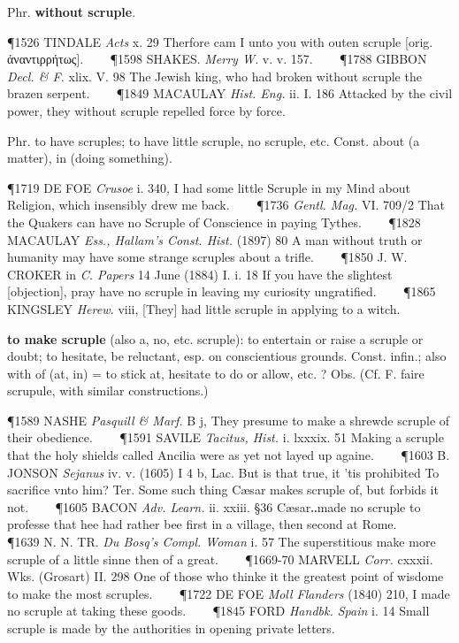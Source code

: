 \begin{description}[wide, labelwidth=!, labelindent=0pt]
\begin{myenumerate}
 Phr. \textbf{without scruple}.

\P 1526 TINDALE  \textit{Acts} x. 29 Therfore cam I unto you with outen scruple [orig. ἀναντιρρήτως].    
\P 1598 SHAKES.  \textit{Merry W.} v. v. 157.    
\P 1788 GIBBON  \textit{Decl. \& F.} xlix. V. 98 The Jewish king, who had broken without scruple the brazen serpent.    
\P 1849 MACAULAY  \textit{Hist. Eng.} ii. I. 186 Attacked by the civil power, they without scruple repelled force by force.

 Phr. to have scruples; to have little scruple, no scruple, etc. Const. about (a matter), in (doing something).

\P 1719 DE FOE  \textit{Crusoe} i. 340, I had some little Scruple in my Mind about Religion, which insensibly drew me back.    
\P 1736  \textit{Gentl. Mag.} VI. 709/2 That the Quakers can have no Scruple of Conscience in paying Tythes.    
\P 1828 MACAULAY  \textit{Ess., Hallam's Const. Hist.} (1897) 80 A man without truth or humanity may have some strange scruples about a trifle.    
\P 1850 J. W. CROKER in \textit{C. Papers} 14 June (1884) I. i. 18 If you have the slightest [objection], pray have no scruple in leaving my curiosity ungratified.    
\P 1865 KINGSLEY  \textit{Herew.} viii, [They] had little scruple in applying to a witch.

 \textbf{to make scruple} (also a, no, etc. scruple): to entertain or raise a scruple or doubt; to hesitate, be reluctant, esp. on conscientious grounds. Const. infin.; also with of (at, in) = to stick at, hesitate to do or allow, etc. ? Obs. (Cf. F. faire scrupule, with similar constructions.)

\P 1589 NASHE  \textit{Pasquill \& Marf.} B j, They presume to make a shrewde scruple of their obedience.    
\P 1591 SAVILE  \textit{Tacitus, Hist.} i. lxxxix. 51 Making a scruple that the holy shields called Ancilia were as yet not layed up againe.    
\P 1603 B. JONSON  \textit{Sejanus} iv. v. (1605) I 4 b, Lac. But is that true, it 'tis prohibited To sacrifice vnto him? Ter. Some such thing Cæsar makes scruple of, but forbids it not.    
\P 1605 BACON  \textit{Adv. Learn.} ii. xxiii. §36 Cæsar‥made no scruple to professe that hee had rather bee first in a village, then second at Rome.    
\P 1639 N. N. TR.  \textit{Du Bosq's Compl. Woman} i. 57 The superstitious make more scruple of a little sinne then of a great.    
\P 1669-70 MARVELL  \textit{Corr.} cxxxii. Wks. (Grosart) II. 298 One of those who thinke it the greatest point of wisdome to make the most scruples.    
\P 1722 DE FOE  \textit{Moll Flanders} (1840) 210, I made no scruple at taking these goods.    
\P 1845 FORD  \textit{Handbk. Spain} i. 14 Small scruple is made by the authorities in opening private letters.


\end{myenumerate}
\end{description}
